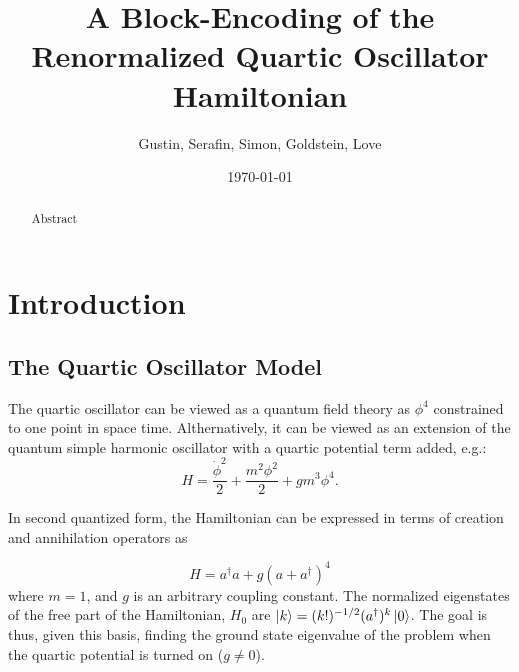 \documentclass[%
 reprint,
nofootinbib,
 amsmath,amssymb,
 aps,
]{revtex4-2}
\numberwithin{equation}{section}
\begin{document}

\title{A Block-Encoding of the Renormalized Quartic Oscillator Hamiltonian}%

\author{Gustin, Serafin, Simon, Goldstein, Love}%

%



\date{\today}%

\begin{abstract}
Abstract
\end{abstract}

\maketitle

\section{Introduction}
\subsection{The Quartic Oscillator Model} 
The quartic oscillator can be viewed as a quantum field theory as $\phi^4$ constrained to
one point in space time. Althernatively, it can be viewed as an extension of the quantum
simple harmonic oscillator with a quartic potential term added, e.g.:
\begin{equation}
  H = \frac{\dot{\phi}^2}{2} + \frac{m^2\phi^2}{2} + gm^3\phi^4.
\end{equation}

In second quantized form, the Hamiltonian can be expressed in terms of creation and 
annihilation operators as

\begin{equation}
  \label{Hamiltonian}
  H = a^\dagger a + g(a + a^\dagger)^4
\end{equation}
where $m = 1$, and $g$ is an arbitrary coupling constant. The normalized eigenstates of
the free part of the Hamiltonian, $H_0$ are $\ket{k} = (k!)^{-1/2}(a^\dagger)^k\ket{0}$. The goal
is thus, given this basis, finding the ground state eigenvalue of the problem when the 
quartic potential is turned on ($g \neq 0$). 
\end{document}
